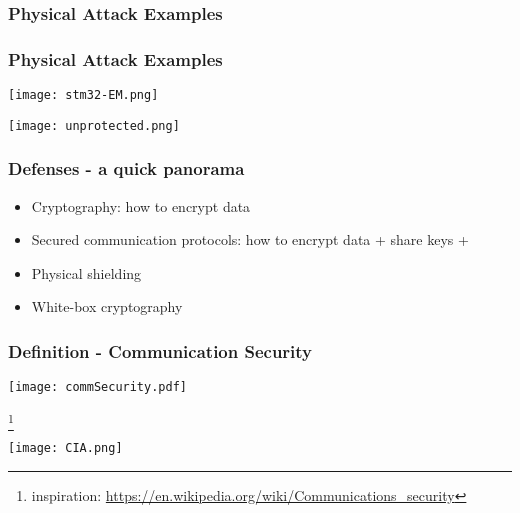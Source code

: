 \documentclass[
hyperref={pdfpagelabels=false}
,xcolor=table
]
{beamer}
\begin{document}
\begin{frame}
  \frametitle{Physical Attack Examples}

  
\end{frame}


\begin{frame}
  \frametitle{Physical Attack Examples}
  \begin{minipage}{.3\linewidth}
    \texttt{[image: stm32-EM.png]}
  \end{minipage}
  \hfill
    \begin{minipage}{.3\linewidth}
      \texttt{[image: unprotected.png]}
  \end{minipage}
\end{frame}


\begin{frame}
  \frametitle{Defenses - a quick panorama}
  \begin{itemize}
  \item Cryptography: how to encrypt data
  \item Secured communication protocols: how to encrypt data + share keys + 
  \item Physical shielding
  \item White-box cryptography    
  \end{itemize}
\end{frame}






\begin{frame}[fragile]
  \frametitle{Definition - Communication Security}
  \begin{block}{}
    \begin{center}
      \texttt{[image: commSecurity.pdf]}
    \end{center}
    \footnote{inspiration: \url{https://en.wikipedia.org/wiki/Communications_security}}
  \end{block}

  \begin{center}
    \texttt{[image: CIA.png]}
  \end{center}
  
  
\end{frame}
\end{document}
